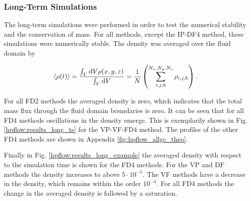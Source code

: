 \subsubsection{Long-Term Simulations}

The long-term simulations were performed in order to test the numerical stability and the conservation of mass.
For all methods, except the IP-DF4 method, these simulations were numerically stable.
The density was averaged over the fluid domain by

\begin{align}
    \label{vali:density_calc}
    \left<\rho(t)\right> = \frac{\int_V \mathop{}\!\mathrm{d} V \rho(x,y,z)}{\int_V \mathop{}\!\mathrm{d} V} =
    \frac{1}{N}\left(\sum_{i,j,k}^{N_x, N_y, N_z} \rho_{i,j,k}\right).
\end{align}


For all FD2 methods the averaged density is zero, which indicates that the total mass flux through the
fluid domain boundaries is zero.
It can be seen that for all FD4 methods oscillations in the density emerge.
This is exemplarily shown in Fig.  \ref{hpflow:results_long_ts} for the VP-VF-FD4 method.
The profiles of the other FD4 methods are shown in Appendix \ref{fig:hpflow_allgc_theo}.

Finally in Fig. \ref{hpflow:results_long_example} the averaged density with respect to the simulation time is shown for the
FD4 methods.  For the VP and DF methods the density increases to above $5\cdot10^{-5}$.
The VF methods have a decrease in the density, which remains within the order $10^{-4}$.
For all FD4 methods the change in the averaged density is followed by a saturation.

